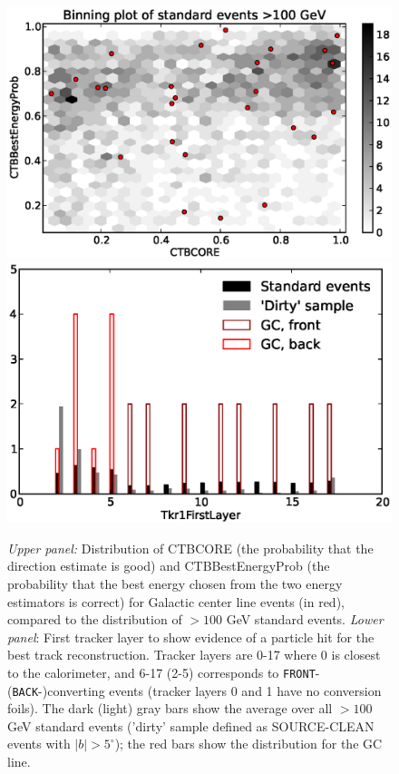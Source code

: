 \documentclass[aps,twocolumn,prd,superscriptaddress,showpacs,nofootinbib,fixfloat]{revtex4}
\begin{document}
\begin{figure}
  \centering
  \includegraphics[width=1.00\linewidth]{plots/CTBCORE_CTBBestEnergyProb.eps}
  \includegraphics[width=1.00\linewidth]{plots/Tkr1FirstLayer.eps}
  \caption{\emph{Upper panel:} Distribution of CTBCORE (the
  probability that the direction estimate is good) and
  CTBBestEnergyProb (the probability that the best energy
  chosen from the two energy estimators is correct) for
  Galactic center line events (in red), compared to the
  distribution of $>100$ GeV standard events. \emph{Lower
  panel}: First tracker layer to show evidence of a particle
  hit for the best track reconstruction. Tracker layers are
  0-17 where 0 is closest to the calorimeter, and 6-17 (2-5)
  corresponds to \texttt{FRONT}- (\texttt{BACK}-)converting events (tracker
  layers 0 and 1 have no conversion foils). The dark (light) gray
  bars show the average over all $>100$ GeV
  standard events ('dirty' sample defined as SOURCE-CLEAN events with
  $|b|>5^\circ$); the red bars show the distribution for the GC line.}
  \label{fig:CTBquality}
\end{figure}
\end{document}
